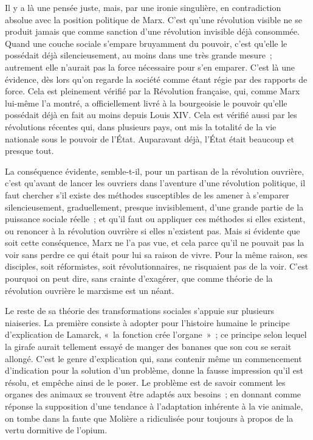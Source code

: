 \documentclass[french,twoside]{book} %
\begin{document}
Il y a là une pensée juste, mais, par une ironie singulière, en contradiction absolue avec la position politique de Marx. C'est qu'une révolution visible ne se produit jamais que comme sanction d'une révolution invisible déjà consommée. Quand une couche sociale s'empare bruyamment du pouvoir, c’est qu'elle le possédait déjà silencieusement, au moins dans une très grande mesure ; autrement elle n'aurait pas la force nécessaire pour s'en emparer. C'est là une évidence, dès lors qu'on regarde la société comme étant régie par des rapports de force. Cela est pleinement vérifié par la Révolution française, qui, comme Marx lui-même l'a montré, a officiellement livré à la bourgeoisie le pouvoir qu'elle possédait déjà en fait au moins depuis Louis XIV. Cela est vérifié aussi par les révolutions récentes qui, dans plusieurs pays, ont mis la totalité de la vie nationale sous le pouvoir de l'État. Auparavant déjà, l'État était beaucoup et presque tout.\par
La conséquence évidente, semble-t-il, pour un partisan de la révolution ouvrière, c'est qu'avant de lancer les ouvriers dans l'aventure d'une révolution politique, il faut chercher s'il existe des méthodes susceptibles de les amener à s'emparer silencieusement, graduellement, presque invisiblement, d'une grande partie de la puissance sociale réelle ; et qu'il faut ou appliquer ces méthodes si elles existent, ou renoncer à la révolution ouvrière si elles n'existent pas. Mais si évidente que soit cette conséquence, Marx ne l'a pas vue, et cela parce qu'il ne pouvait pas la voir sans perdre ce qui était pour lui sa raison de vivre. Pour la même raison, ses disciples, soit réformistes, soit révolutionnaires, ne risquaient pas de la voir. C'est pourquoi on peut dire, sans crainte d'exagérer, que comme théorie de la révolution ouvrière le marxisme est un néant.\par
Le reste de sa théorie des transformations sociales s'appuie sur plusieurs niaiseries. La première consiste à adopter pour l'histoire humaine le principe d'explication de Lamarck, « la fonction crée l'organe » ; ce principe selon lequel la girafe aurait tellement essayé de manger des bananes que son cou se serait allongé. C'est le genre d'explication qui, sans contenir même un commencement d'indication pour la solution d'un problème, donne la fausse impression qu'il est résolu, et empêche ainsi de le poser. Le problème est de savoir comment les organes des animaux se trouvent être adaptés aux besoins ; en donnant comme réponse la supposition d'une tendance à l'adaptation inhérente à la vie animale, on tombe dans la faute que Molière a ridiculisée pour toujours à propos de la vertu dormitive de l'opium.\par
\end{document}
